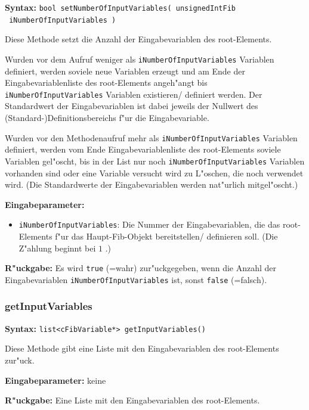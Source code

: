 \textbf{Syntax:} \verb|bool setNumberOfInputVariables( unsignedIntFib| \\\verb| iNumberOfInputVariables )|

\bigskip\noindent
Diese Methode setzt die Anzahl der Eingabevariablen des root-Elements.

Wurden vor dem Aufruf weniger als \verb|iNumberOfInputVariables| Variablen definiert, werden soviele neue Variablen erzeugt und am Ende der Eingabevariablenliste des root-Elements angeh"angt bis \verb|iNumberOfInputVariables| Variablen existieren/ definiert werden. Der Standardwert der Eingabevariablen ist dabei jeweils der Nullwert des (Standard-)Definitionsbereichs f"ur die Eingabevariable.

Wurden vor den Methodenaufruf mehr als \verb|iNumberOfInputVariables| Variablen definiert, werden vom Ende Eingabevariablenliste des root-Elements soviele Variablen gel"oscht, bis in der List nur noch \verb|iNumberOfInputVariables| Variablen vorhanden sind oder eine Variable versucht wird zu L"oschen, die noch verwendet wird. (Die Standardwerte der Eingabevariablen werden nat"urlich mitgel"oscht.)

\bigskip\noindent
\textbf{Eingabeparameter:}
\begin{itemize}
 \item \verb|iNumberOfInputVariables|: Die Nummer der Eingabevariablen, die das root-Elements f"ur das Haupt-Fib-Objekt bereitstellen/ definieren soll. (Die Z"ahlung beginnt bei $1$ .)
\end{itemize}

\bigskip\noindent
\textbf{R"uckgabe:} Es wird \verb|true| (=wahr) zur"uckgegeben, wenn die Anzahl der Eingabevariablen \verb|iNumberOfInputVariables| ist, sonst \verb|false| (=falsch).


\subsubsection{getInputVariables}

\textbf{Syntax:} \verb|list<cFibVariable*> getInputVariables()|

\bigskip\noindent
Diese Methode gibt eine Liste mit den Eingabevariablen des root-Elements zur"uck.

\bigskip\noindent
\textbf{Eingabeparameter:} keine

\bigskip\noindent
\textbf{R"uckgabe:} Eine Liste mit den Eingabevariablen des root-Elements.


